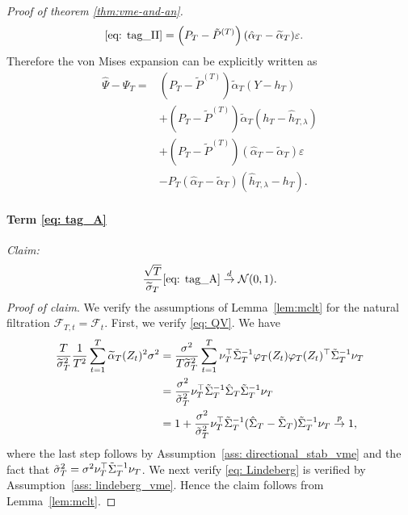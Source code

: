 \documentclass[11pt]{article}
\begin{document}
\begin{proof}[Proof of theorem \ref{thm:vme-and-an}]
\begin{align*}
    \eqref{eq: tag_II} &= \left(P_T - \Tilde{P}^{(T)}\right)(\hat{\alpha}_T - \widetilde \alpha_T)\varepsilon. 
\end{align*}
Therefore the von Mises expansion can be explicitly written as
\begin{align}
    \hat{\Psi} - \Psi_T =& \left(P_T - \widetilde P^{(T)}\right) \widetilde \alpha_T (Y - h_T) \tag{A} \label{eq: tag_A}\\
    &+ \left(P_T - \widetilde P^{(T)}\right) \widetilde \alpha_T (h_T - \hat{h}_{T,\lambda}) \tag{B} \label{eq: tag_B}\\
    &+ \left(P_T - \widetilde P^{(T)}\right) (\widehat \alpha_T - \widetilde \alpha_T) \varepsilon \tag{C} \label{eq: tag_C}\\
    &- P_T (\widehat \alpha_T - \widetilde \alpha_T) (\widehat h_{T,\lambda} - h_T) \tag{D} \label{eq: tag_D}. 
\end{align}
\paragraph{Term \eqref{eq: tag_A}} \emph{Claim: }
\begin{align*}
    \frac{\sqrt{T}}{\widetilde \sigma_T}\eqref{eq: tag_A} \overset{d}{\rightarrow} \mathcal{N}(0,1).
\end{align*}
\emph{Proof of claim}. We verify the assumptions of Lemma~\ref{lem:mclt} for the natural filtration $\mathcal{F}_{T,t} = \mathcal{F}_t$. First, we verify \eqref{eq: QV}. We have
\begin{align*}
    \frac{T}{\widetilde \sigma_T^2}\frac{1}{T^2}\sum_{t=1}^{T}\widetilde \alpha_T(Z_t)^2 \sigma^2 &= \frac{\sigma^2}{T\widetilde \sigma_T^2} \sum_{t=1}^{T}\nu_T^{\top}\Tilde{\Sigma}_T^{-1}\varphi_T(Z_t)\varphi_T(Z_t)^{\top}\Tilde{\Sigma}_T^{-1}\nu_T\\
    &= \frac{\sigma^2}{\Tilde{\sigma}_T^2}\nu_T^{\top}\Tilde{\Sigma}_T^{-1}\hat{\Sigma}_T\Tilde{\Sigma}_T^{-1}\nu_T\\
    &= 1 + \frac{\sigma^2}{\Tilde{\sigma}_T^2}\nu_T^{\top}\Tilde{\Sigma}_T^{-1}(\hat{\Sigma}_T - \Tilde{\Sigma}_T)\Tilde{\Sigma}_T^{-1}\nu_T \overset{p}{\rightarrow} 1,
\end{align*}
where the last step follows by Assumption~\ref{ass: directional_stab_vme} and the fact that $\Tilde{\sigma}_T^2 = \sigma^2 \nu_T^{\top}\Tilde{\Sigma}_T^{-1}\nu_T$. We next verify \eqref{eq: Lindeberg} is verified by Assumption~\ref{ass: lindeberg_vme}. Hence the claim follows from Lemma~\ref{lem:mclt}. 


\end{proof}
\end{document}
